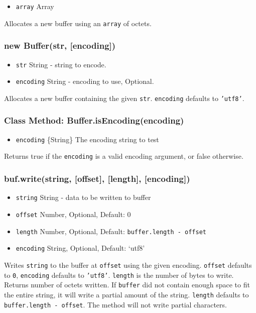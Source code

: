 \begin{itemize}
\item
  \texttt{array} Array
\end{itemize}

Allocates a new buffer using an \texttt{array} of octets.

\subsubsection{new Buffer(str, {[}encoding{]})}

\begin{itemize}
\item
  \texttt{str} String - string to encode.
\item
  \texttt{encoding} String - encoding to use, Optional.
\end{itemize}

Allocates a new buffer containing the given \texttt{str}.
\texttt{encoding} defaults to \texttt{'utf8'}.

\subsubsection{Class Method: Buffer.isEncoding(encoding)}

\begin{itemize}
\item
  \texttt{encoding} \{String\} The encoding string to test
\end{itemize}

Returns true if the \texttt{encoding} is a valid encoding argument, or
false otherwise.

\subsubsection{buf.write(string, {[}offset{]}, {[}length{]},
{[}encoding{]})}

\begin{itemize}
\item
  \texttt{string} String - data to be written to buffer
\item
  \texttt{offset} Number, Optional, Default: 0
\item
  \texttt{length} Number, Optional, Default:
  \texttt{buffer.length - offset}
\item
  \texttt{encoding} String, Optional, Default: `utf8'
\end{itemize}

Writes \texttt{string} to the buffer at \texttt{offset} using the given
encoding. \texttt{offset} defaults to \texttt{0}, \texttt{encoding}
defaults to \texttt{'utf8'}. \texttt{length} is the number of bytes to
write. Returns number of octets written. If \texttt{buffer} did not
contain enough space to fit the entire string, it will write a partial
amount of the string. \texttt{length} defaults to
\texttt{buffer.length - offset}. The method will not write partial
characters.


